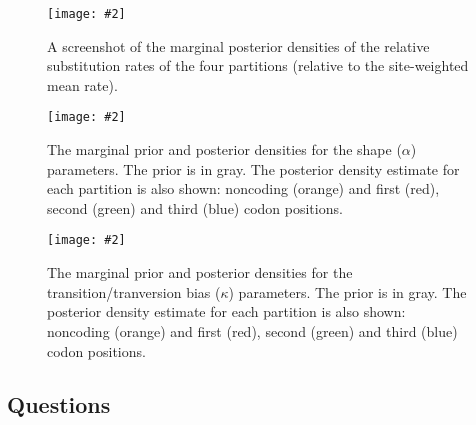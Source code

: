 \documentclass[11pt]{article}
\theoremstyle{plain}%
\theoremstyle{definition}
\theoremstyle{remark}
\newcommand{\includeimage}[2][]{%
\texttt{[image: \#2]}
}
\begin{document}


\begin{figure}
\centering	
\includeimage[width=\textwidth]{figures/Tracer_marginalDensity}
\label{fig:Tracer_marginalDensity}
\caption{A screenshot of the marginal posterior densities of the relative substitution rates of the four partitions (relative to the site-weighted mean rate).}
\end{figure}


\begin{figure}
\centering	
\includeimage[width=\textwidth]{figures/primatePriorPosteriorKappa}

%
\label{fig:primatePriorPosteriorShape}
\caption{The marginal prior and posterior densities for the shape ($\alpha$) parameters. The prior is in gray. The posterior density estimate for each partition is also shown: noncoding (orange) and first (red), second (green) and third (blue) codon positions.}

\includeimage[width=\textwidth]{figures/primatePriorPosteriorShape}

%
\label{fig:primatePriorPosteriorKappa}
\caption{The marginal prior and posterior densities for the transition/tranversion bias ($\kappa$) parameters. The prior is in gray. The posterior density estimate for each partition is also shown: noncoding (orange) and first (red), second (green) and third (blue) codon positions.}
\end{figure}

\newpage
\subsection*{Questions}
\vspace{5 mm}
\end{document}
